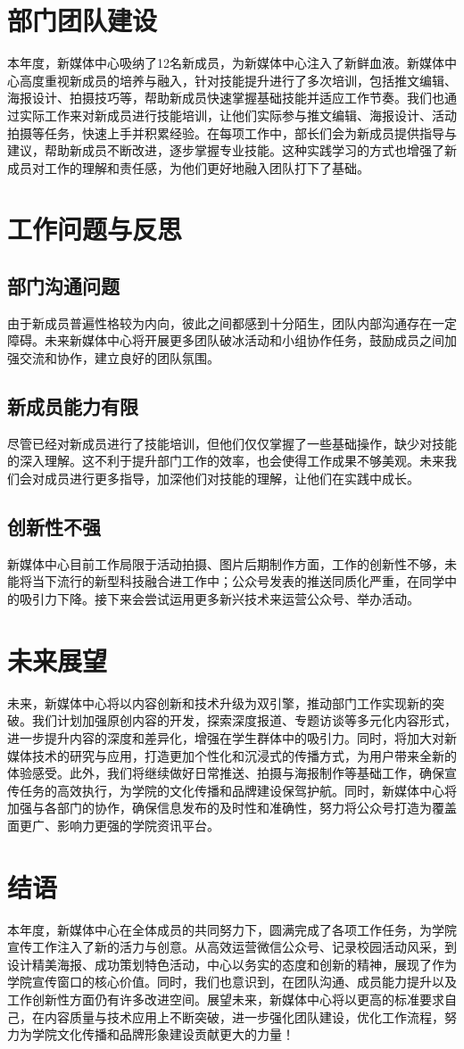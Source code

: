 \documentclass{article}
\begin{document}
\section{部门团队建设}
本年度，新媒体中心吸纳了12名新成员，为新媒体中心注入了新鲜血液。新媒体中心高度重视新成员的培养与融入，针对技能提升进行了多次培训，包括推文编辑、海报设计、拍摄技巧等，帮助新成员快速掌握基础技能并适应工作节奏。我们也通过实际工作来对新成员进行技能培训，让他们实际参与推文编辑、海报设计、活动拍摄等任务，快速上手并积累经验。在每项工作中，部长们会为新成员提供指导与建议，帮助新成员不断改进，逐步掌握专业技能。这种实践学习的方式也增强了新成员对工作的理解和责任感，为他们更好地融入团队打下了基础。

\section{工作问题与反思}
\subsection{部门沟通问题}
由于新成员普遍性格较为内向，彼此之间都感到十分陌生，团队内部沟通存在一定障碍。未来新媒体中心将开展更多团队破冰活动和小组协作任务，鼓励成员之间加强交流和协作，建立良好的团队氛围。
\subsection{新成员能力有限}
尽管已经对新成员进行了技能培训，但他们仅仅掌握了一些基础操作，缺少对技能的深入理解。这不利于提升部门工作的效率，也会使得工作成果不够美观。未来我们会对成员进行更多指导，加深他们对技能的理解，让他们在实践中成长。
\subsection{创新性不强}
新媒体中心目前工作局限于活动拍摄、图片后期制作方面，工作的创新性不够，未能将当下流行的新型科技融合进工作中；公众号发表的推送同质化严重，在同学中的吸引力下降。接下来会尝试运用更多新兴技术来运营公众号、举办活动。
\section{未来展望}
未来，新媒体中心将以内容创新和技术升级为双引擎，推动部门工作实现新的突破。我们计划加强原创内容的开发，探索深度报道、专题访谈等多元化内容形式，进一步提升内容的深度和差异化，增强在学生群体中的吸引力。同时，将加大对新媒体技术的研究与应用，打造更加个性化和沉浸式的传播方式，为用户带来全新的体验感受。此外，我们将继续做好日常推送、拍摄与海报制作等基础工作，确保宣传任务的高效执行，为学院的文化传播和品牌建设保驾护航。同时，新媒体中心将加强与各部门的协作，确保信息发布的及时性和准确性，努力将公众号打造为覆盖面更广、影响力更强的学院资讯平台。
\section{结语}
本年度，新媒体中心在全体成员的共同努力下，圆满完成了各项工作任务，为学院宣传工作注入了新的活力与创意。从高效运营微信公众号、记录校园活动风采，到设计精美海报、成功策划特色活动，中心以务实的态度和创新的精神，展现了作为学院宣传窗口的核心价值。同时，我们也意识到，在团队沟通、成员能力提升以及工作创新性方面仍有许多改进空间。展望未来，新媒体中心将以更高的标准要求自己，在内容质量与技术应用上不断突破，进一步强化团队建设，优化工作流程，努力为学院文化传播和品牌形象建设贡献更大的力量！
\end{document}
